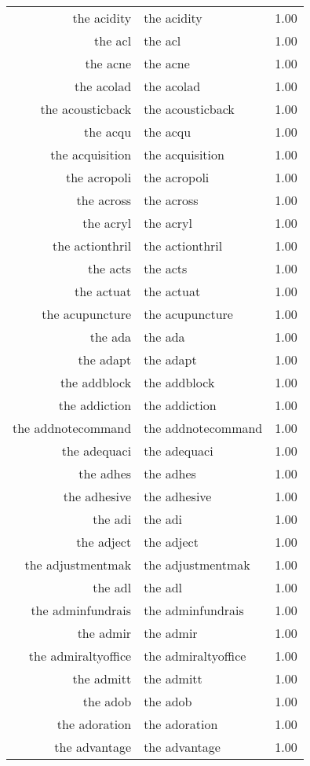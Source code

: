 \begin{table}[ht]
\begin{tabular}{rlr}
  the acidity & the acidity & 1.00 \\ 
  the acl & the acl & 1.00 \\ 
  the acne & the acne & 1.00 \\ 
  the acolad & the acolad & 1.00 \\ 
  the acousticback & the acousticback & 1.00 \\ 
  the acqu & the acqu & 1.00 \\ 
  the acquisition & the acquisition & 1.00 \\ 
  the acropoli & the acropoli & 1.00 \\ 
  the across & the across & 1.00 \\ 
  the acryl & the acryl & 1.00 \\ 
  the actionthril & the actionthril & 1.00 \\ 
  the acts & the acts & 1.00 \\ 
  the actuat & the actuat & 1.00 \\ 
  the acupuncture & the acupuncture & 1.00 \\ 
  the ada & the ada & 1.00 \\ 
  the adapt & the adapt & 1.00 \\ 
  the addblock & the addblock & 1.00 \\ 
  the addiction & the addiction & 1.00 \\ 
  the addnotecommand & the addnotecommand & 1.00 \\ 
  the adequaci & the adequaci & 1.00 \\ 
  the adhes & the adhes & 1.00 \\ 
  the adhesive & the adhesive & 1.00 \\ 
  the adi & the adi & 1.00 \\ 
  the adject & the adject & 1.00 \\ 
  the adjustmentmak & the adjustmentmak & 1.00 \\ 
  the adl & the adl & 1.00 \\ 
  the adminfundrais & the adminfundrais & 1.00 \\ 
  the admir & the admir & 1.00 \\ 
  the admiraltyoffice & the admiraltyoffice & 1.00 \\ 
  the admitt & the admitt & 1.00 \\ 
  the adob & the adob & 1.00 \\ 
  the adoration & the adoration & 1.00 \\ 
  the advantage & the advantage & 1.00 \\ 

\end{tabular}
\end{table}
